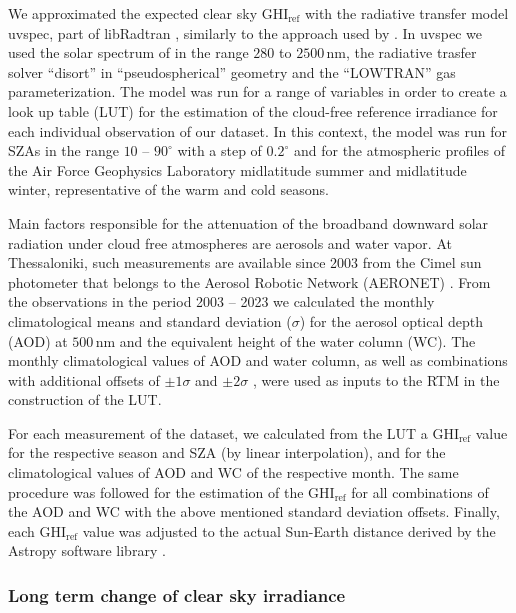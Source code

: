 \documentclass[preprint, 5p,
authoryear]{elsarticle} %
\begin{document}
We approximated the expected clear sky \(\text{GHI}_\text{ref}\) with
the radiative transfer model uvspec, part of libRadtran
\citep{Emde2016}, similarly to the approach used by
\citet{Vamvakas2020}. In uvspec we used the solar spectrum of
\citet{Kurucz1994} in the range \(280\) to \(2500\,\text{nm}\), the
radiative trasfer solver ``disort'' in ``pseudospherical'' geometry and
the ``LOWTRAN'' gas parameterization. The model was run for a range of
variables in order to create a look up table (LUT) for the estimation of
the cloud-free reference irradiance for each individual observation of
our dataset. In this context, the model was run for SZAs in the range
\(10\) -- \(90^\circ\) with a step of \(0.2^\circ\) and for the
atmospheric profiles of the Air Force Geophysics Laboratory
\citep{Anderson1986} midlatitude summer and midlatitude winter,
representative of the warm and cold seasons.

Main factors responsible for the attenuation of the broadband downward
solar radiation under cloud free atmospheres are aerosols and water
vapor. At Thessaloniki, such measurements are available since 2003 from
the Cimel sun photometer that belongs to the Aerosol Robotic Network
(AERONET) \citep{Giles2019, Buis1998}. From the observations in the
period 2003 -- 2023 we calculated the monthly climatological means and
standard deviation (\(\sigma\)) for the aerosol optical depth (AOD) at
\(500\,\text{nm}\) and the equivalent height of the water column (WC).
The monthly climatological values of AOD and water column, as well as
combinations with additional offsets of \(\pm1\sigma\) and
\(\pm2\sigma\) , were used as inputs to the RTM in the construction of
the LUT.

For each measurement of the dataset, we calculated from the LUT a
\(\text{GHI}_\text{ref}\) value for the respective season and SZA (by
linear interpolation), and for the climatological values of AOD and WC
of the respective month. The same procedure was followed for the
estimation of the \(\text{GHI}_\text{ref}\) for all combinations of the
AOD and WC with the above mentioned standard deviation offsets. Finally,
each \(\text{GHI}_\text{ref}\) value was adjusted to the actual
Sun-Earth distance derived by the Astropy software library
\citep{AstropyCollaboration2022}.

\hypertarget{long-term-change-of-clear-sky-irradiance}{%
\subsubsection{Long term change of clear sky
irradiance}\label{long-term-change-of-clear-sky-irradiance}}
\end{document}
